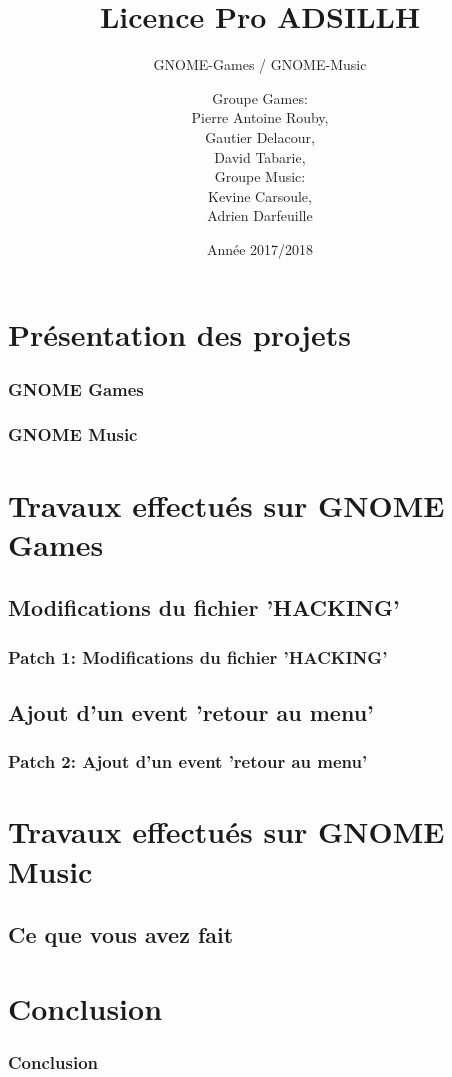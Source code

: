 \documentclass{beamer}
\title{Licence Pro ADSILLH}
\subtitle{GNOME-Games / GNOME-Music}
\author{Groupe Games:\\ Pierre Antoine Rouby,\\ Gautier Delacour,\\
  David Tabarie,\\
  \vspace{0.8cm}
  Groupe Music:\\ Kevine Carsoule,\\ Adrien Darfeuille}
\date{Année 2017/2018}
\begin{document}
\frame{\titlepage}

\section{Présentation des projets}

\begin{frame}
  \frametitle{GNOME Games}
\end{frame}

\begin{frame}
  \frametitle{GNOME Music}
\end{frame}

\section{Travaux effectués sur GNOME Games}
\subsection{Modifications du fichier 'HACKING'}
\begin{frame}
  \frametitle{Patch 1: Modifications du fichier 'HACKING'}
\end{frame}

\subsection{Ajout d'un event 'retour au menu'}
\begin{frame}
  \frametitle{Patch 2: Ajout d'un event 'retour au menu'}
\end{frame}

\section{Travaux effectués sur GNOME Music}
\subsection{Ce que vous avez fait}
\begin{frame}
  \frametitle{}
\end{frame}

\section{Conclusion}
\begin{frame}
  \frametitle{Conclusion}
\end{frame}
\end{document}
